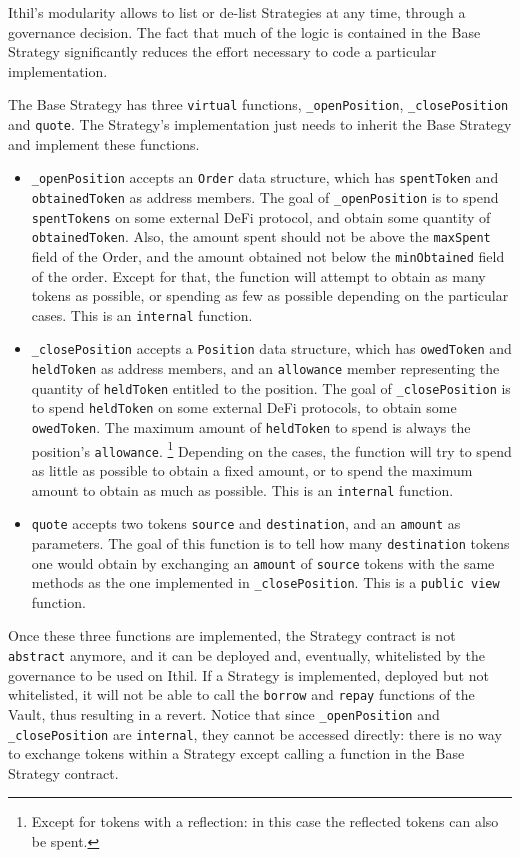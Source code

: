 \documentclass[a4paper,10 pt]{article}
\theoremstyle{definition}
\begin{document}
Ithil's modularity allows to list or de-list Strategies at any time, through a governance decision. The fact that much of the logic is contained in the Base Strategy significantly reduces the effort necessary to code a particular implementation.

The Base Strategy has three \verb|virtual| functions, \verb|_openPosition|, \verb|_closePosition| and \verb|quote|. The Strategy's implementation just needs to inherit the Base Strategy and implement these functions.

\begin{itemize}
\item \verb|_openPosition| accepts an \verb|Order| data structure, which has \verb|spentToken| and \verb|obtainedToken| as address members. The goal of \verb|_openPosition| is to spend \verb|spentTokens| on some external DeFi protocol, and obtain some quantity of \verb|obtainedToken|. Also, the amount spent should not be above the \verb|maxSpent| field of the Order, and the amount obtained not below the \verb|minObtained| field of the order. Except for that, the function will attempt to obtain as many tokens as possible, or spending as few as possible depending on the particular cases. This is an \verb|internal| function.
\item \verb|_closePosition| accepts a \verb|Position| data structure, which has \verb|owedToken| and \verb|heldToken| as address members, and an \verb|allowance| member representing the quantity of \verb|heldToken| entitled to the position. The goal of \verb|_closePosition| is to spend \verb|heldToken| on some external DeFi protocols, to obtain some \verb|owedToken|. The maximum amount of \verb|heldToken| to spend is always the position's \verb|allowance|. \footnote{Except for tokens with a reflection: in this case the reflected tokens can also be spent.} Depending on the cases, the function will try to spend as little as possible to obtain a fixed amount, or to spend the maximum amount to obtain as much as possible. This is an \verb|internal| function.
\item \verb|quote| accepts two tokens \verb|source| and \verb|destination|, and an \verb|amount| as parameters. The goal of this function is to tell how many \verb|destination| tokens one would obtain by exchanging an \verb|amount| of \verb|source| tokens with the same methods as the one implemented in \verb|_closePosition|. This is a \verb|public view| function.
\end{itemize}

Once these three functions are implemented, the Strategy contract is not \verb|abstract| anymore, and it can be deployed and, eventually, whitelisted by the governance to be used on Ithil. If a Strategy is implemented, deployed but not whitelisted, it will not be able to call the \verb|borrow| and \verb|repay| functions of the Vault, thus resulting in a revert. Notice that since \verb|_openPosition| and \verb|_closePosition| are \verb|internal|, they cannot be accessed directly: there is no way to exchange tokens within a Strategy except calling a function in the Base Strategy contract.
\end{document}
